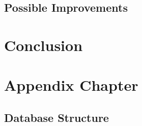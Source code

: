 \documentclass[a4paper, oneside]{csthesis}
\begin{document}
\section{Possible Improvements}

\chapter{Conclusion}

	




\appendix
\chapter{Appendix Chapter}

\section{Database Structure}

	
\end{document}
